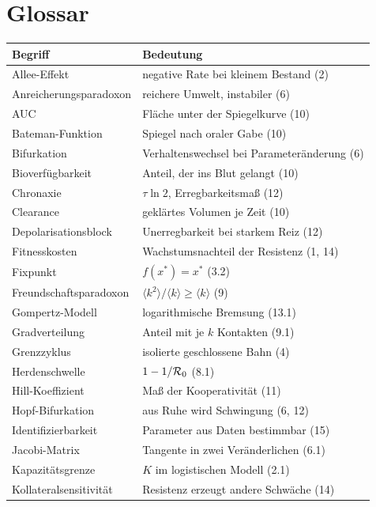 \section{Glossar}

\begin{merksatz}
\begin{center}
{\small
\renewcommand{\arraystretch}{1.3}
\begin{longtable}{@{}P{3.6cm}P{5.0cm}@{}}
\toprule
\textbf{Begriff} & \textbf{Bedeutung}\\
\midrule
\endhead
Allee-Effekt & negative Rate bei kleinem Bestand (2)\\
Anreicherungs\-paradoxon & reichere Umwelt, instabiler (6)\\
AUC & Fläche unter der Spiegelkurve (10)\\
Bateman-Funktion & Spiegel nach oraler Gabe (10)\\
Bifurkation & Verhaltenswechsel bei Parameteränderung (6)\\
Bioverfügbarkeit & Anteil, der ins Blut gelangt (10)\\
Chronaxie & $\tau\ln2$, Erregbarkeitsmaß (12)\\
Clearance & geklärtes Volumen je Zeit (10)\\
Depolarisations\-block & Unerregbarkeit bei starkem Reiz (12)\\
Fitnesskosten & Wachstumsnachteil der Resistenz (1, 14)\\
Fixpunkt & $f(x^{*}) = x^{*}$ (3.2)\\
Freundschafts\-paradoxon & $\langle k^2\rangle/\langle k\rangle \ge \langle k\rangle$ (9)\\
Gompertz-Modell & logarithmische Bremsung (13.1)\\
Gradverteilung & Anteil mit je $k$ Kontakten (9.1)\\
Grenzzyklus & isolierte geschlossene Bahn (4)\\
Herdenschwelle & $1-1/\mathcal{R}_0$ (8.1)\\
Hill-Koeffizient & Maß der Kooperativität (11)\\
Hopf-Bifurkation & aus Ruhe wird Schwingung (6, 12)\\
Identifizierbarkeit & Parameter aus Daten bestimmbar (15)\\
Jacobi-Matrix & Tangente in zwei Veränderlichen (6.1)\\
Kapazitätsgrenze & $K$ im logistischen Modell (2.1)\\
Kollateral\-sensitivität & Resistenz erzeugt andere Schwäche (14)\\

\end{longtable}}
\end{center}
\end{merksatz}
